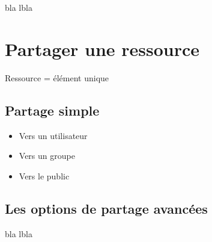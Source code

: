 bla lbla

\section*{Partager une ressource}

Ressource = élément unique

\subsection*{Partage simple}

\begin{itemize}
    \item Vers un utilisateur
    \item Vers un groupe
    \item Vers le public 
\end{itemize}

\subsection*{Les options de partage avancées}

bla lbla